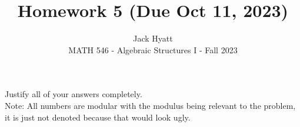 \documentclass[12pt]{article}
\begin{document}
	
	
	
	\title{Homework 5 (Due Oct 11, 2023)}
	\author{Jack Hyatt\\ %
		MATH 546 - Algebraic Structures I - Fall 2023} 
	
	\maketitle
	
	Justify all of your answers completely.\\
	Note: All numbers are modular with the modulus being relevant to the problem, it is just not denoted because that would look ugly.\\
	
	\medskip 
	
\end{document}
